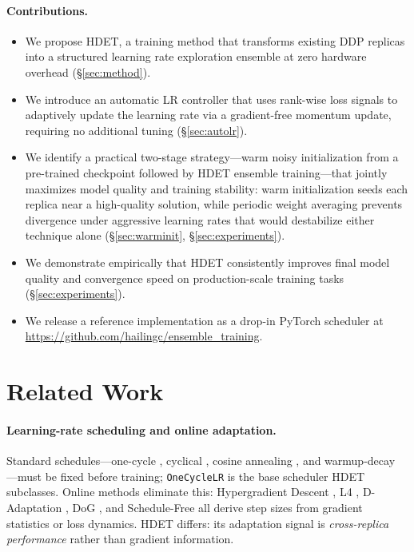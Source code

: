 \documentclass{article}
\begin{document}
\paragraph{Contributions.}
\begin{itemize}
  \item We propose HDET, a training method that transforms existing DDP replicas
    into a structured learning rate exploration ensemble at zero hardware overhead
    (\S\ref{sec:method}).
  \item We introduce an automatic LR controller that uses rank-wise loss signals
    to adaptively update the learning rate via a gradient-free momentum update,
    requiring no additional tuning (\S\ref{sec:autolr}).
  \item We identify a practical two-stage strategy---warm noisy initialization from a
    pre-trained checkpoint followed by HDET ensemble training---that jointly maximizes
    model quality and training stability: warm initialization seeds each replica near a
    high-quality solution, while periodic weight averaging prevents divergence under
    aggressive learning rates that would destabilize either technique alone
    (\S\ref{sec:warminit}, \S\ref{sec:experiments}).
  \item We demonstrate empirically that HDET consistently improves final model
    quality and convergence speed on production-scale training tasks
    (\S\ref{sec:experiments}).
  \item We release a reference implementation as a drop-in PyTorch scheduler
    at \url{https://github.com/hailingc/ensemble_training}.
\end{itemize}

\section{Related Work}
\label{sec:related}

\paragraph{Learning-rate scheduling and online adaptation.}
Standard schedules---one-cycle \citep{smith2019super}, cyclical \citep{smith2017cyclical},
cosine annealing \citep{loshchilov2017sgdr}, and warmup-decay \citep{vaswani2017attention}---must
be fixed before training; \texttt{OneCycleLR} \citep{paszke2019pytorch} is the base
scheduler HDET subclasses.
Online methods eliminate this: Hypergradient Descent \citep{baydin2018hypergradient},
L4 \citep{rolinek2018l4}, D-Adaptation \citep{defazio2023learning}, DoG
\citep{ivgi2023dog}, and Schedule-Free \citep{defazio2024road} all derive step sizes
from gradient statistics or loss dynamics.
HDET differs: its adaptation signal is \emph{cross-replica performance} rather than
gradient information.
\end{document}
